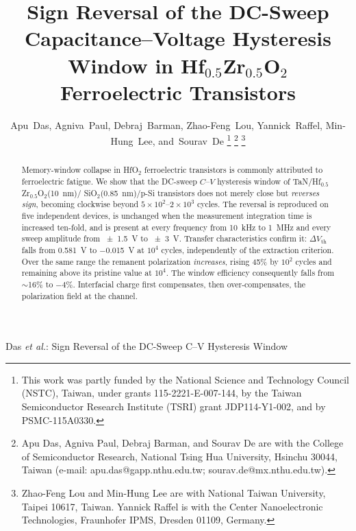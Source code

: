 \documentclass[journal]{IEEEtran}
\newcommand{\rev}[1]{#1}                    %
\newcommand{\hzo}{Hf$_{0.5}$Zr$_{0.5}$O$_2$}
\newcommand{\Vth}{V_{\mathrm{th}}}
\begin{document}
\title{\rev{Sign Reversal of the DC-Sweep Capacitance--Voltage Hysteresis
Window in \hzo{} Ferroelectric Transistors}}

\author{Apu~Das, Agniva~Paul, Debraj~Barman, Zhao-Feng~Lou,
        Yannick~Raffel, Min-Hung~Lee, and~Sourav~De
\thanks{This work was partly funded by the National Science and Technology
Council (NSTC), Taiwan, under grants 115-2221-E-007-144, by the Taiwan
Semiconductor Research Institute (TSRI) grant JDP114-Y1-002, and by
PSMC-115A0330.}
\thanks{Apu Das, Agniva Paul, Debraj Barman, and Sourav De are with the
College of Semiconductor Research, National Tsing Hua University, Hsinchu
30044, Taiwan (e-mail: apu.das@gapp.nthu.edu.tw; sourav.de@mx.nthu.edu.tw).}
\thanks{Zhao-Feng Lou and Min-Hung Lee are with National Taiwan University,
Taipei 10617, Taiwan. Yannick Raffel is with the Center Nanoelectronic
Technologies, Fraunhofer IPMS, Dresden 01109, Germany.}}

%
{Das \MakeLowercase{\textit{et al.}}: Sign Reversal of the DC-Sweep C--V Hysteresis Window}
\maketitle

\begin{abstract}
\rev{Memory-window collapse in HfO$_2$ ferroelectric transistors is
commonly attributed to ferroelectric fatigue. We show that the DC-sweep
$C$--$V$ hysteresis window of TaN/\hzo{}(\SI{10}{\nano\meter})/
SiO$_2$(\SI{0.85}{\nano\meter})/p-Si transistors does not merely close
but \emph{reverses sign}, becoming clockwise beyond
$5\times10^2$--$2\times10^3$ cycles. The reversal is reproduced on five
independent devices, is unchanged when the measurement integration time
is increased ten-fold, and is present at every frequency from
\SI{10}{\kilo\hertz} to \SI{1}{\mega\hertz} and every sweep amplitude
from \SI{\pm1.5}{\volt} to \SI{\pm3}{\volt}. Transfer characteristics
confirm it: $\Delta\Vth$ falls from \SI{+0.581}{\volt} to
\SI{-0.015}{\volt} at $10^4$ cycles, independently of the extraction
criterion. Over the same range the remanent polarization
\emph{increases}, rising 45\% by $10^2$ cycles and remaining above its
pristine value at $10^4$. The window efficiency consequently falls from
$\sim$16\% to $-4$\%. Interfacial charge first compensates, then
over-compensates, the polarization field at the channel.}
\end{abstract}
\end{document}

